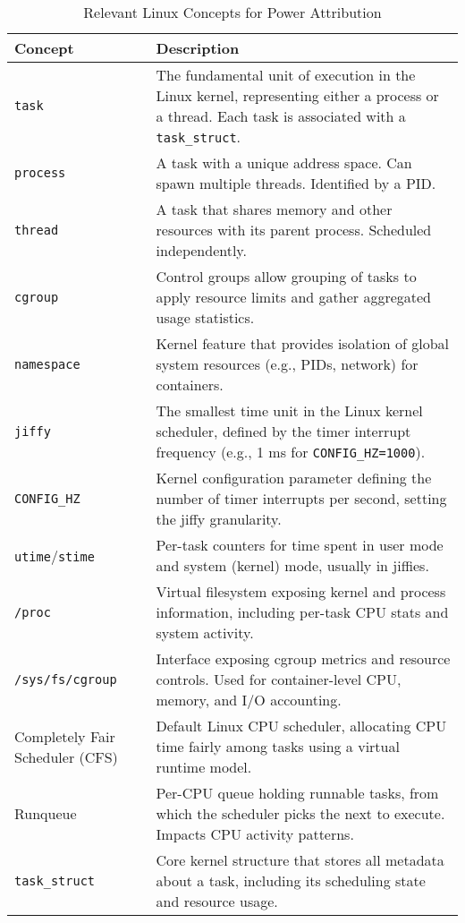 \begin{table}[H]
\centering
\caption{Relevant Linux Concepts for Power Attribution}
\begin{tabular}{p{3.2cm} p{10.8cm}}
\toprule
\textbf{Concept} & \textbf{Description} \\
\midrule
\texttt{task} & The fundamental unit of execution in the Linux kernel, representing either a process or a thread. Each task is associated with a \texttt{task\_struct}. \\
\texttt{process} & A task with a unique address space. Can spawn multiple threads. Identified by a PID. \\
\texttt{thread} & A task that shares memory and other resources with its parent process. Scheduled independently. \\
\texttt{cgroup} & Control groups allow grouping of tasks to apply resource limits and gather aggregated usage statistics. \\
\texttt{namespace} & Kernel feature that provides isolation of global system resources (e.g., PIDs, network) for containers. \\
\texttt{jiffy} & The smallest time unit in the Linux kernel scheduler, defined by the timer interrupt frequency (e.g., 1 ms for \texttt{CONFIG\_HZ=1000}). \\
\texttt{CONFIG\_HZ} & Kernel configuration parameter defining the number of timer interrupts per second, setting the jiffy granularity. \\
\texttt{utime}/\texttt{stime} & Per-task counters for time spent in user mode and system (kernel) mode, usually in jiffies. \\
\texttt{/proc} & Virtual filesystem exposing kernel and process information, including per-task CPU stats and system activity. \\
\texttt{/sys/fs/cgroup} & Interface exposing cgroup metrics and resource controls. Used for container-level CPU, memory, and I/O accounting. \\
Completely Fair Scheduler (CFS) & Default Linux CPU scheduler, allocating CPU time fairly among tasks using a virtual runtime model. \\
Runqueue & Per-CPU queue holding runnable tasks, from which the scheduler picks the next to execute. Impacts CPU activity patterns. \\
\texttt{task\_struct} & Core kernel structure that stores all metadata about a task, including its scheduling state and resource usage. \\
\bottomrule
\end{tabular}
\end{table}



